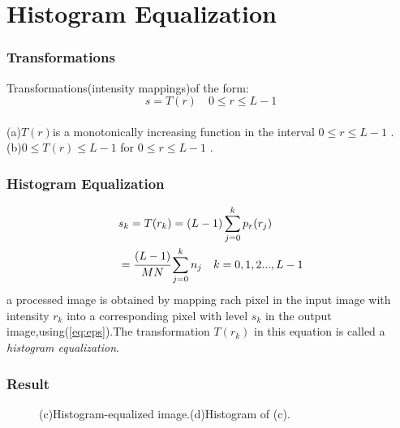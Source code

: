 \documentclass[notheorems,serif,table,compress]{beamer}  %
\begin{document}
\section{Histogram Equalization}
\begin{frame}
\frametitle{Transformations}
Transformations(intensity mappings)of the form:\\
\begin{equation}
s=T(r)\quad 0\leq r\leq L-1
\end{equation}\\
{\color{blue}(a)}$T(r)$is a monotonically increasing function in the interval $0\leq r\leq L-1$ .\\
{\color{blue}(b)}$0\leq T(r)\leq L-1$ for $0\leq r\leq L-1$ .
\end{frame}
\begin{frame}
\frametitle{Histogram Equalization}
\begin{align} \label{eq:eps}
&s_k=T(r_k)=(L-1)\sum_{j=0}^k p_r(r_j)  \\
&=\cfrac{(L-1)}{MN}\sum_{j=0}^k n_j \quad k=0,1,2...,L-1\nonumber
\end{align}
a processed image is obtained by mapping rach pixel in the input image with intensity    $r_k$ into a corresponding pixel with level $s_k$ in the output image,using(\ref{eq:eps}).The transformation $T(r_k)$ in this equation is called a \emph{histogram equalization}.
\end{frame}
\begin{frame}
\frametitle{Result}
\begin{figure}
\begin{center}
\end{center}
\caption{(a)Origin image.(b)Histogram of (a).}
\begin{center}
\end{center}
\caption{(c)Histogram-equalized image.(d)Histogram of (c).}
\end{figure}
\end{frame}
\end{document}
